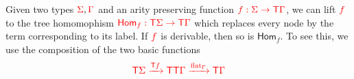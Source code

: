 \noindent \begin{example}\label{ex:patternMatching} 
\end{example}
\medskip

\noindent \begin{example}\label{ex:morphism} 
Given two types ${\color{red}{\Sigma}}, {\color{red}{\Gamma}}$ and an arity preserving  function ${\color{red}{f:\Sigma\to{\color{red}{\mathsf T}}\Gamma}}$, we can lift ${\color{red}{f}}$ to the tree homomophism  ${\color{red}{\mathsf{Hom}_f:{\color{red}{\mathsf T}}\Sigma\to {\color{red}{\mathsf T}}\Gamma}}$ which replaces every node by the term corresponding to its label. If ${\color{red}{f}}$ is derivable, then so is  $\mathsf{Hom}_f$. To see this, we use the composition of the two basic functions
\begin{align*}
{\color{red}{{\color{red}{\mathsf T}}\Sigma\xrightarrow{{\color{red}{\mathsf T}}f}{\color{red}{\mathsf T}}{\color{red}{\mathsf T}}\Gamma \xrightarrow{{\color{red}{\mathrm{flat}}}_\Gamma} {\color{red}{\mathsf T}}\Gamma}}
\end{align*} 
\end{example}
\medskip

